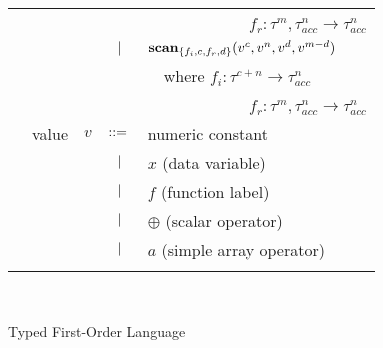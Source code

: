 \documentclass[preprint]{sigplanconf}
\begin{document}
\begin{figure}
\begin{tabular}{| m{0.01cm}m{1.3cm}m{0.1cm}m{0.2cm}p{4.5cm} |}
  &            &     &           & ~~~~~~~~~~~~ $f_r : \tau^m, \tau^n_{acc} \rightarrow \tau^n_{acc}$ \\[2pt]
  &            &     & $\ \ | \ \ $    & $\mbox{\textbf{scan}} _{\{ f_i, c, f_r, d \}} (v^{c}, v^n, v^{d}, v^{m-d})$ \\[2pt]
  &            &     &           & ~~where $f_i : \tau^{c+n} \rightarrow \tau^n_{acc}$ \\[2pt]
  &            &     &           & ~~~~~~~~~~~~ $f_r : \tau^m, \tau^n_{acc} \rightarrow \tau^n_{acc}$ \\[5pt]
  & value      & $v$ & $::=$ & numeric constant\\[2pt]
  &            &     & $\ \ | \ \ $    &  $x$  \quad \small{(data variable)} \\[2pt]
  &            &     & $\ \ | \ \ $    &  $f$  \quad \small{(function label)} \\[2pt]
  &            &     & $\ \ | \ \ $    &  $\oplus$ \quad \small{(scalar operator)} \\[2pt]
  &            &     & $\ \ | \ \ $    &  $a$ \quad \small{(simple array operator)} \\[5pt]

  & & & &\\
  \hline
  \end{tabular}\\[4pt]
\caption{Typed First-Order Language}
\end{figure}
\end{document}
